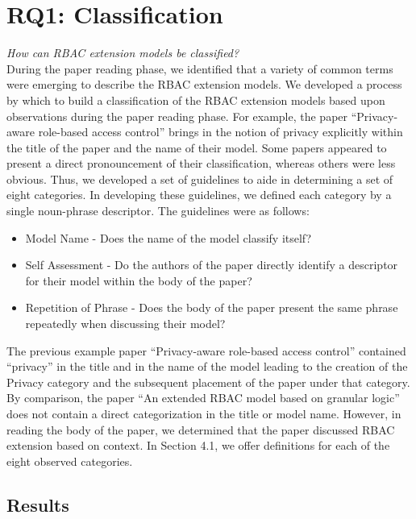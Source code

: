 \section{RQ1: Classification} \label{sec:categorization}

\textit{How can RBAC extension models be classified?}
\\

During the paper reading phase, we identified that a variety of common terms were emerging to describe the RBAC extension models. 
We developed a process by which to build a classification of the RBAC extension models based upon observations during the paper reading phase.
For example, the paper ``Privacy-aware role-based access control'' \cite{ni2010privacy} brings in the notion of privacy explicitly within the title of the paper and the name of their model. 
Some papers appeared to present a direct pronouncement of their classification, whereas others were less obvious.
Thus, we developed a set of guidelines to aide in determining a set of eight categories. 
In developing these guidelines, we defined each category by a single noun-phrase descriptor.
The guidelines were as follows:

\begin{itemize}
\item Model Name - Does the name of the model classify itself?
\item Self Assessment - Do the authors of the paper directly identify a descriptor for their model within the body of the paper?
\item Repetition of Phrase - Does the body of the paper present the same phrase repeatedly when discussing their model?
\end{itemize}

The previous example paper ``Privacy-aware role-based access control'' \cite{ni2010privacy} contained ``privacy'' in the title and in the name of the model leading to the creation of the Privacy category and the subsequent placement of the paper under that category.
By comparison, the paper ``An extended RBAC model based on granular logic'' \cite{jian2008extended} does not contain a direct categorization in the title or model name. 
However, in reading the body of the paper, we determined that the paper discussed RBAC extension based on context. 
In Section 4.1, we offer definitions for each of the eight observed categories.

\subsection{Results}

